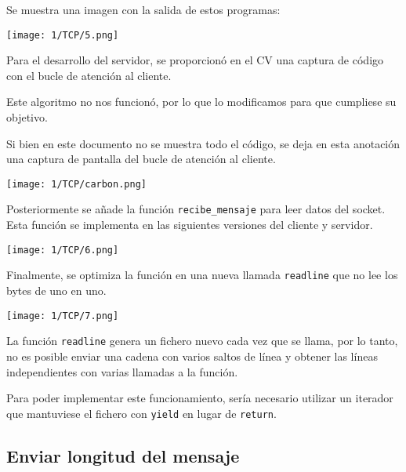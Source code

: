 Se muestra una imagen con la salida de estos programas:

\begin{minipage}{\linewidth}
	\centering
	\texttt{[image: 1/TCP/5.png]}
	\label{fig:1/7}
\end{minipage}

\begin{notebox}
    Para el desarrollo del servidor,
    se proporcionó en el CV una captura de código
    con el bucle de atención al cliente.

    Este algoritmo no nos funcionó,
    por lo que lo modificamos para que cumpliese su objetivo.

    Si bien en este documento no se muestra todo el código,
    se deja en esta anotación una captura de pantalla del bucle
    de atención al cliente.

	\texttt{[image: 1/TCP/carbon.png]}
\end{notebox}

Posteriormente se añade la función \verb#recibe_mensaje#
para leer datos del socket.
Esta función se implementa en las siguientes versiones del cliente
y servidor.

\begin{minipage}{\linewidth}
	\centering
	\texttt{[image: 1/TCP/6.png]}
	\label{fig:1/8}
\end{minipage}

Finalmente, se optimiza la función en una nueva llamada \verb#readline#
que no lee los bytes de uno en uno.

\begin{minipage}{\linewidth}
	\centering
	\texttt{[image: 1/TCP/7.png]}
	\label{fig:1/9}
\end{minipage}

La función \verb#readline# genera un fichero nuevo cada vez que se llama,
por lo tanto, no es posible enviar una cadena con varios saltos
de línea y obtener las líneas independientes con varias llamadas a la
función.

Para poder implementar este funcionamiento,
sería necesario utilizar un iterador que mantuviese el fichero
con \verb#yield# en lugar de \verb#return#.

\subsection{Enviar longitud del mensaje}

